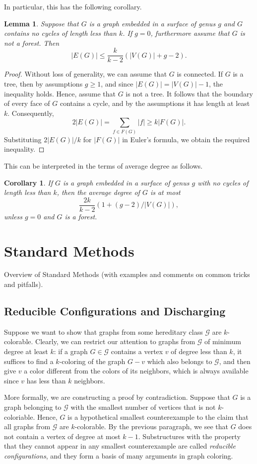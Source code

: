 \documentclass[12pt,twoside,openright,a4paper]{book}
\newtheorem{lemma}[theorem]{Lemma}
\newtheorem{corollary}[theorem]{Corollary}
\newcommand{\GG}{\mathcal{G}}
\begin{document}
In particular, this has the following corollary.
\begin{lemma}\label{lemma:numedges}
Suppose that $G$ is a graph embedded in a surface of genus $g$ and $G$ contains no cycles of length less than $k$.
If $g=0$, furthermore assume that $G$ is not a forest. Then
$$|E(G)|\le \frac{k}{k-2}(|V(G)|+g-2).$$
\end{lemma}
\begin{proof}
Without loss of generality, we can assume that $G$ is connected.  If $G$ is a tree, then by assumptions
$g\ge 1$, and since $|E(G)|=|V(G)|-1$, the inequality holds.
Hence, assume that $G$ is not a tree.  It follows that the boundary
of every face of $G$ contains a cycle, and by the assumptions it has length at least $k$.
Consequently,
$$2|E(G)|=\sum_{f\in F(G)} |f|\ge k|F(G)|.$$
Substituting $2|E(G)|/k$ for $|F(G)|$ in Euler's formula, we obtain the required inequality.
\end{proof}

This can be interpreted in the terms of average degree as follows.
\begin{corollary}\label{cor:mad}
If $G$ is a graph embedded in a surface of genus $g$ with no cycles of length less than $k$,
then the average degree of $G$ is at most
$$\frac{2k}{k-2}(1+(g-2)/|V(G)|),$$
unless $g=0$ and $G$ is a forest.
\end{corollary}

\part{Standard Methods}

Overview of Standard Methods (with examples and comments on common tricks and pitfalls).

\chapter{Reducible Configurations and Discharging}\label{chap:redu}

Suppose we want to show that graphs from some hereditary class $\GG$ are $k$-colorable.  Clearly, we can
restrict our attention to graphs from $\GG$ of minimum degree at least $k$: if a graph $G\in \GG$
contains a vertex $v$ of degree less than $k$, it suffices to find a $k$-coloring of the graph $G-v$
which also belongs to $\GG$, and then give $v$ a color different from the colors of its neighbors,
which is always available since $v$ has less than $k$ neighbors.

More formally, we are constructing a proof by contradiction.  Suppose that $G$ is a graph belonging to $\GG$
with the smallest number of vertices that is not $k$-coloriable.  Hence, $G$ is a hypothetical smallest counterexample
to the claim that all graphs from $\GG$ are $k$-colorable.
By the previous paragraph, we see that $G$ does not contain a vertex of degree at most $k-1$.
Substructures with the property that they cannot appear in any smallest counterexample
are called \emph{reducible configurations}, and they form a basis of many arguments in graph coloring.
\end{document}
